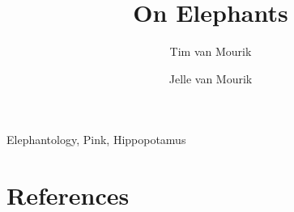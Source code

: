 \documentclass[preprint,authoryear]{../../Stylesheets/elsarticle/elsarticle}
\numberwithin{equation}{section}
\numberwithin{figure}{section}
\begin{document}

\begin{frontmatter}
\title{On Elephants}

\author[DccnAddres]{Tim van Mourik}
\author[YorkAddress,SonyAddress]{Jelle van Mourik}

\address[DccnAddres]{Donders Institute for Brain, Cognition and Behaviour, Radboud University Nijmegen, 6525 EN Nijmegen, The Netherlands}
\address[YorkAddress]{The Department of Electronics, The University of York, Heslington, York, North Yorkshire, YO10 5DD}
\address[SonyAddress]{Sony Computer Entertainment Europe, 10-15 Great Marlborough St, London W1F 7HR, United Kingdom}

\begin{keyword}

Elephantology, Pink, Hippopotamus
\end{keyword}
\end{frontmatter}

\newpage

\savethetrees

\savethetrees

\savethetrees

\savethetrees

\savethetrees

\savethetrees

\section{References}

\onecolumn

%
\end{document}
